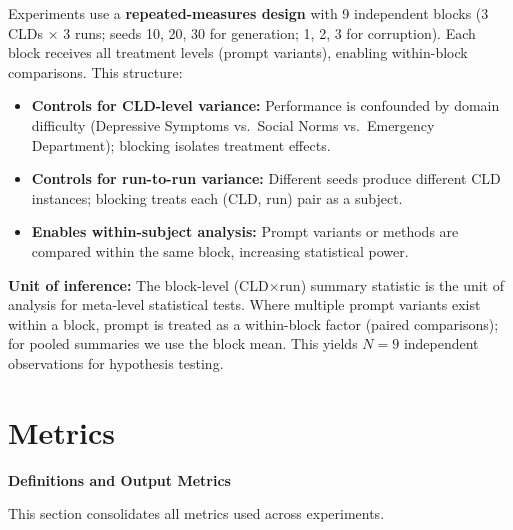 Experiments use a \textbf{repeated-measures design} with 9 independent blocks (3 CLDs $\times$ 3 runs; seeds 10, 20, 30 for generation; 1, 2, 3 for corruption). Each block receives all treatment levels (prompt variants), enabling within-block comparisons. This structure:

\begin{itemize}[noitemsep]
    \item \textbf{Controls for CLD-level variance:} Performance is confounded by domain difficulty (Depressive Symptoms vs.\ Social Norms vs.\ Emergency Department); blocking isolates treatment effects.
    \item \textbf{Controls for run-to-run variance:} Different seeds produce different CLD instances; blocking treats each (CLD, run) pair as a subject.
    \item \textbf{Enables within-subject analysis:} Prompt variants or methods are compared within the same block, increasing statistical power.
\end{itemize}

\textbf{Unit of inference:} The block-level (CLD$\times$run) summary statistic is the unit of analysis for meta-level statistical tests. Where multiple prompt variants exist within a block, prompt is treated as a within-block factor (paired comparisons); for pooled summaries we use the block mean. This yields $N=9$ independent observations for hypothesis testing.

\section{Metrics}

\noindent\textbf{Definitions and Output Metrics}
\label{sec:metrics_definitions}

This section consolidates all metrics used across experiments.

